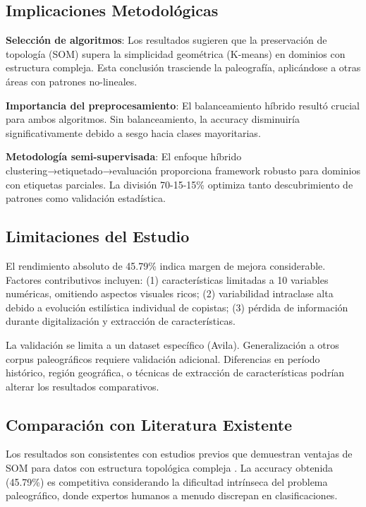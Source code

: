\documentclass[12pt,a4paper]{article}
\begin{document}
\subsection{Implicaciones Metodológicas}

\textbf{Selección de algoritmos}: Los resultados sugieren que la preservación de topología (SOM) supera la simplicidad geométrica (K-means) en dominios con estructura compleja. Esta conclusión trasciende la paleografía, aplicándose a otras áreas con patrones no-lineales.

\textbf{Importancia del preprocesamiento}: El balanceamiento híbrido resultó crucial para ambos algoritmos. Sin balanceamiento, la accuracy disminuiría significativamente debido a sesgo hacia clases mayoritarias.

\textbf{Metodología semi-supervisada}: El enfoque híbrido clustering→etiquetado→evaluación proporciona framework robusto para dominios con etiquetas parciales. La división 70-15-15\% optimiza tanto descubrimiento de patrones como validación estadística.

\subsection{Limitaciones del Estudio}

El rendimiento absoluto de 45.79\% indica margen de mejora considerable. Factores contributivos incluyen: (1) características limitadas a 10 variables numéricas, omitiendo aspectos visuales ricos; (2) variabilidad intraclase alta debido a evolución estilística individual de copistas; (3) pérdida de información durante digitalización y extracción de características.

La validación se limita a un dataset específico (Avila). Generalización a otros corpus paleográficos requiere validación adicional. Diferencias en período histórico, región geográfica, o técnicas de extracción de características podrían alterar los resultados comparativos.

\subsection{Comparación con Literatura Existente}

Los resultados son consistentes con estudios previos que demuestran ventajas de SOM para datos con estructura topológica compleja \cite{vesanto2000}. La accuracy obtenida (45.79\%) es competitiva considerando la dificultad intrínseca del problema paleográfico, donde expertos humanos a menudo discrepan en clasificaciones.
\end{document}
